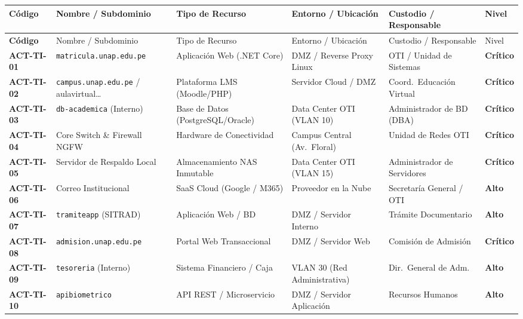 \begin{center}
\scriptsize
\setlength{\tabcolsep}{3pt}
\renewcommand{\arraystretch}{1.2}
\begin{longtable}{>{\bfseries}p{1.6cm} p{3.2cm} p{2.7cm} p{2.5cm} p{2.6cm} >{\centering\arraybackslash}p{1.4cm}}
\toprule
\rowcolor{outermarginbgcolor}
Código & Nombre / Subdominio & Tipo de Recurso & Entorno / Ubicación & Custodio / Responsable & Nivel \\
\midrule
\endfirsthead
\toprule
\rowcolor{outermarginbgcolor}
Código & Nombre / Subdominio & Tipo de Recurso & Entorno / Ubicación & Custodio / Responsable & Nivel \\
\midrule
\endhead
\bottomrule
\endfoot
ACT-TI-01 & \texttt{matri\allowbreak cula.\allowbreak unap.\allowbreak edu.pe} & Aplicación Web (.NET Core) & DMZ / Reverse Proxy Linux & OTI / Unidad de Sistemas & \textbf{Crítico} \\
\midrule
ACT-TI-02 & \texttt{campus.\allowbreak unap.\allowbreak edu.pe} \newline / aulavirtual\dots & Plataforma LMS (Moodle/PHP) & Servidor Cloud / DMZ & Coord.\ Educación Virtual & \textbf{Crítico} \\
\midrule
ACT-TI-03 & \texttt{db-academica} (Interno) & Base de Datos (PostgreSQL/Oracle) & Data Center OTI (VLAN 10) & Administrador de BD (DBA) & \textbf{Crítico} \\
\midrule
ACT-TI-04 & Core Switch \& Firewall NGFW & Hardware de Conectividad & Campus Central (Av.\ Floral) & Unidad de Redes OTI & \textbf{Crítico} \\
\midrule
ACT-TI-05 & Servidor de Respaldo Local & Almacenamiento NAS Inmutable & Data Center OTI (VLAN 15) & Administrador de Servidores & \textbf{Crítico} \\
\midrule
ACT-TI-06 & Correo Institucional & SaaS Cloud (Google / M365) & Proveedor en la Nube & Secretaría General / OTI & \textbf{Alto} \\
\midrule
ACT-TI-07 & \texttt{tramiteapp} (SITRAD) & Aplicación Web / BD & DMZ / Servidor Interno & Trámite Documentario & \textbf{Alto} \\
\midrule
ACT-TI-08 & \texttt{admision.\allowbreak unap.\allowbreak edu.pe} & Portal Web Transaccional & DMZ / Servidor Web & Comisión de Admisión & \textbf{Crítico} \\
\midrule
ACT-TI-09 & \texttt{tesoreria} (Interno) & Sistema Financiero / Caja & VLAN 30 (Red Administrativa) & Dir.\ General de Adm. & \textbf{Alto} \\
\midrule
ACT-TI-10 & \texttt{apibiometrico} & API REST / Microservicio & DMZ / Servidor Aplicación & Recursos Humanos & \textbf{Alto} \\

\end{longtable}
\end{center}
